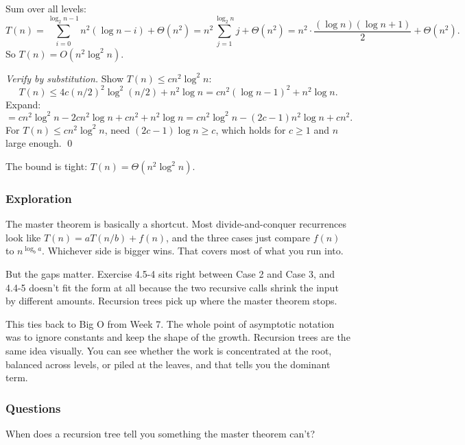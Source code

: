 \documentclass{article}
\theoremstyle{theorem}
\theoremstyle{definition}
\theoremstyle{remark}
\begin{document}
Sum over all levels:
\[
  T(n) = \sum_{i=0}^{\log_2 n - 1} n^2 (\log n - i) + \Theta(n^2) = n^2 \sum_{j=1}^{\log_2 n} j + \Theta(n^2) = n^2 \cdot \frac{(\log n)(\log n + 1)}{2} + \Theta(n^2).
\]
So $T(n) = O(n^2 \log^2 n)$.

\emph{Verify by substitution.} Show $T(n) \leq c n^2 \log^2 n$:
\[
  T(n) \leq 4 c (n/2)^2 \log^2(n/2) + n^2 \log n = c n^2 (\log n - 1)^2 + n^2 \log n.
\]
Expand:
\[
  = c n^2 \log^2 n - 2 c n^2 \log n + c n^2 + n^2 \log n = c n^2 \log^2 n - (2c - 1) n^2 \log n + c n^2.
\]
For $T(n) \leq c n^2 \log^2 n$, need $(2c - 1) \log n \geq c$, which holds for $c \geq 1$ and $n$ large enough. \qed

The bound is tight: $T(n) = \Theta(n^2 \log^2 n)$.

\subsubsection{Exploration}

The master theorem is basically a shortcut. Most divide-and-conquer recurrences look like $T(n) = aT(n/b) + f(n)$, and the three cases just compare $f(n)$ to $n^{\log_b a}$. Whichever side is bigger wins. That covers most of what you run into.

But the gaps matter. Exercise 4.5-4 sits right between Case 2 and Case 3, and 4.4-5 doesn't fit the form at all because the two recursive calls shrink the input by different amounts. Recursion trees pick up where the master theorem stops.

This ties back to Big O from Week 7. The whole point of asymptotic notation was to ignore constants and keep the shape of the growth. Recursion trees are the same idea visually. You can see whether the work is concentrated at the root, balanced across levels, or piled at the leaves, and that tells you the dominant term.

\subsubsection{Questions}

When does a recursion tree tell you something the master theorem can't?
\end{document}
